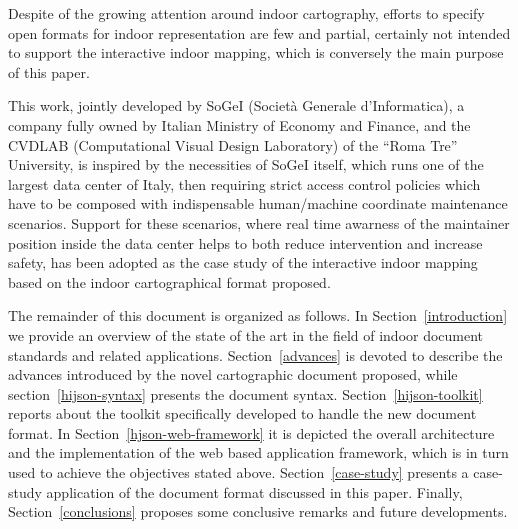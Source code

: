 Despite of the growing attention around indoor cartography, efforts to specify
open formats for indoor representation are few and partial, certainly not
intended to support the interactive indoor mapping, which is conversely the
main purpose of this paper.

This work, jointly developed by {SoGeI} ({So}ciet\`a {Ge}nerale
d'{I}nformatica), a company fully owned by Italian  Ministry of Economy and
Finance, and the {CVDLAB} (Computational Visual Design Laboratory) of the
``Roma Tre'' University, is inspired by the necessities of SoGeI itself, which
runs one of the largest data center of Italy, then requiring strict access
control policies which have to be composed with indispensable human/machine
coordinate maintenance scenarios. Support for these scenarios, where real time
awarness of the maintainer position inside the data center helps to both
reduce intervention and increase safety, has been adopted as the case study of
the interactive indoor mapping based on the indoor cartographical format
proposed.


The remainder of this document is organized as follows. In
Section~\ref{introduction} we provide an overview of the state of the art in
the field of indoor document standards and related applications.
Section~\ref{advances} is devoted to describe the advances introduced by the
novel cartographic document proposed, while section~\ref{hijson-syntax}
presents the document syntax. Section~\ref{hijson-toolkit} reports about the
toolkit specifically developed to handle the new document format. In
Section~\ref{hjson-web-framework} it is depicted the overall architecture and
the implementation of the web based application framework, which is in turn
used to achieve the objectives stated above. Section~\ref{case-study} presents
a case-study application of the document format discussed in this paper.
Finally, Section~\ref{conclusions} proposes some conclusive remarks and future
developments.




